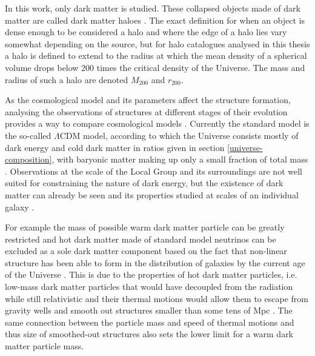 \documentclass[english, twoside]{HYgradu}
\begin{document}
In this work, only dark matter is studied. These collapsed objects made of dark matter are called dark matter haloes \citep{mo2010galaxy}. The exact definition for when an object is dense enough to be considered a halo and where the edge of a halo lies vary somewhat depending on the source, but for halo catalogues analysed in this thesis a halo is defined to extend to the radius at which the mean density of a spherical volume drops below 200 times the critical density of the Universe. The mass and radius of such a halo are denoted $M_{200}$ and $r_{200}$.

As the cosmological model and its parameters affect the structure formation, analysing the observations of structures at different stages of their evolution provides a way to compare cosmological models \citep{mo2010galaxy}. Currently the standard model is the so-called $\Lambda$CDM model, according to which the Universe consists mostly of dark energy and cold dark matter in ratios given in section \ref{universe-composition}, with baryonic matter making up only a small fraction of total mass \citep{mo2010galaxy}. Observations at the scale of the Local Group and its surroundings are not well suited for constraining the nature of dark energy, but the existence of dark matter can already be seen and its properties studied at scales of an individual galaxy \citep{mo2010galaxy}.

For example the mass of possible warm dark matter particle can be greatly restricted \citep{kennedy2014constraining} and hot dark matter made of standard model neutrinos can be excluded as a sole dark matter component based on the fact that non-linear structure has been able to form in the distribution of galaxies by the current age of the Universe \citep{white1984is}. This is due to the properties of hot dark matter particles, i.e. low-mass dark matter particles that would have decoupled from the radiation while still relativistic  and their thermal motions would allow them to escape from gravity wells and smooth out structures smaller than some tens of Mpc \citep{mo2010galaxy}. The same connection between the particle mass and speed of thermal motions and thus size of smoothed-out structures also sets the lower limit for a warm dark matter particle mass.


\end{document}
